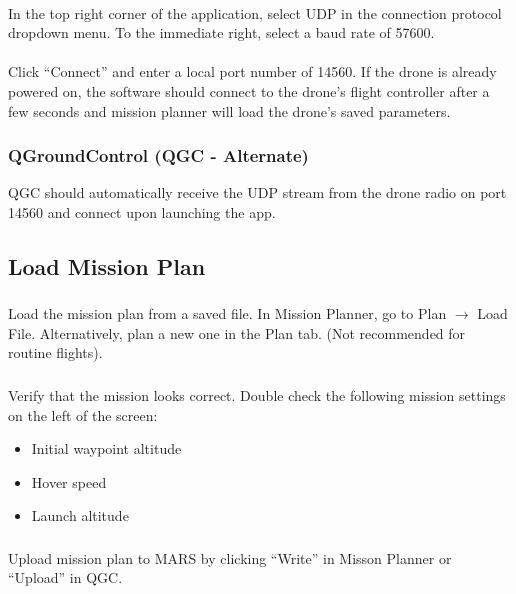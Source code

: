             \paragraph{} In the top right corner of the application, select UDP in the connection protocol dropdown menu. To the immediate right, select a baud rate of 57600.
            \paragraph{} Click “Connect” and enter a local port number of 14560. If the drone is already powered on, the software should connect to the drone’s flight controller after a few seconds and mission planner will load the drone’s saved parameters.
        \subsubsection{QGroundControl (QGC - Alternate)} QGC should automatically receive the UDP stream from the drone radio on port 14560 and connect upon launching the app. 

    \subsection{Load Mission Plan} 
        \subsubsection{} Load the mission plan from a saved file. In Mission Planner, go to Plan $\rightarrow$ Load File. Alternatively, plan a new one in the Plan tab. (Not recommended for routine flights).
        \subsubsection{} Verify that the mission looks correct. Double check the following mission settings on the left of the screen: 
        \begin{itemize}
            \item Initial waypoint altitude 
            \item Hover speed 
            \item Launch altitude 
        \end{itemize}
        \subsubsection{} Upload mission plan to MARS by clicking ``Write” in Misson Planner or ``Upload” in QGC.

